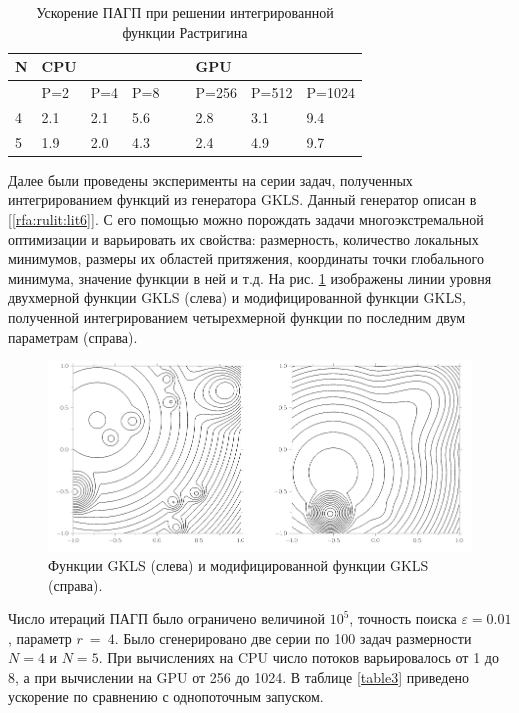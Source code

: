 \documentclass[10pt,a4paper]{book}
\begin{document}
\begin{table}[!ht]
    \centering
            \caption{Ускорение ПАГП при решении интегрированной функции Растригина}
    \label{table2}
    \begin{tabular}{|l|l|l|l|l|l|l|l|}
    \hline
        N & CPU &   & ~ & ~ & GPU  & ~ & ~ \\ \hline
        ~ & P=2 & P=4 & P=8 & ~ & P=256 & P=512 & P=1024  \\ \hline
        4 & 2.1 & 2.1 & 5.6 & ~ & 2.8 & 3.1 & 9.4  \\ \hline
        5 & 1.9 & 2.0 & 4.3 & ~ & 2.4 & 4.9 & 9.7  \\ \hline
    \end{tabular}
\end{table}

Далее были проведены эксперименты на серии задач, полученных интегрированием функций из генератора GKLS. Данный генератор описан в [\ref{rfa:rulit:lit6}]. С его помощью можно порождать задачи многоэкстремальной оптимизации и варьировать их свойства: размерность, количество локальных минимумов, размеры их областей притяжения, координаты точки глобального минимума, значение функции в ней и т.д. На рис. \ref{fig:s3} изображены линии уровня двухмерной функции GKLS (слева) и модифицированной функции GKLS, полученной интегрированием четырехмерной функции по последним двум параметрам (справа).

\begin{figure}
\begin{center}
  \includegraphics[width=1.0\linewidth]{./pic/s3.png}
  \caption{Функции GKLS (слева) и модифицированной функции GKLS (справа).}
  \label{fig:s3}  
\end{center}
\end{figure}

Число итераций ПАГП было ограничено величиной $10^5$, точность поиска $\varepsilon=0.01$, параметр $r\ =\ 4$. Было сгенерировано две серии по 100 задач размерности $N = 4$ и $N = 5$. При вычислениях на CPU число потоков варьировалось от 1 до 8, а при вычислении на GPU от 256 до 1024. В таблице \ref{table3} приведено ускорение по сравнению с однопоточным запуском.
\end{document}
